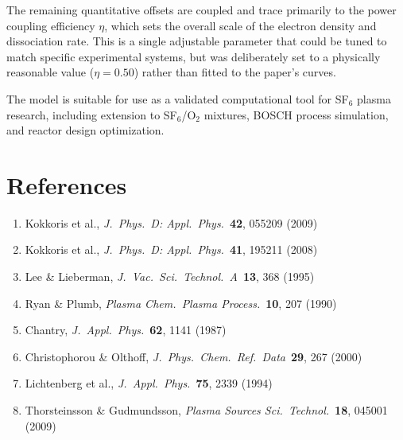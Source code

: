 \documentclass[11pt,a4paper]{article}
\begin{document}
The remaining quantitative offsets are coupled and trace primarily to the power coupling efficiency $\eta$, which sets the overall scale of the electron density and dissociation rate. This is a single adjustable parameter that could be tuned to match specific experimental systems, but was deliberately set to a physically reasonable value ($\eta = 0.50$) rather than fitted to the paper's curves.

The model is suitable for use as a validated computational tool for SF$_6$ plasma research, including extension to SF$_6$/O$_2$ mixtures, BOSCH process simulation, and reactor design optimization.

\section{References}
\begin{enumerate}[nosep]
\item Kokkoris et al., \textit{J.\ Phys.\ D: Appl.\ Phys.}\ \textbf{42}, 055209 (2009)
\item Kokkoris et al., \textit{J.\ Phys.\ D: Appl.\ Phys.}\ \textbf{41}, 195211 (2008)
\item Lee \& Lieberman, \textit{J.\ Vac.\ Sci.\ Technol.\ A}\ \textbf{13}, 368 (1995)
\item Ryan \& Plumb, \textit{Plasma Chem.\ Plasma Process.}\ \textbf{10}, 207 (1990)
\item Chantry, \textit{J.\ Appl.\ Phys.}\ \textbf{62}, 1141 (1987)
\item Christophorou \& Olthoff, \textit{J.\ Phys.\ Chem.\ Ref.\ Data}\ \textbf{29}, 267 (2000)
\item Lichtenberg et al., \textit{J.\ Appl.\ Phys.}\ \textbf{75}, 2339 (1994)
\item Thorsteinsson \& Gudmundsson, \textit{Plasma Sources Sci.\ Technol.}\ \textbf{18}, 045001 (2009)
\end{enumerate}
\end{document}
